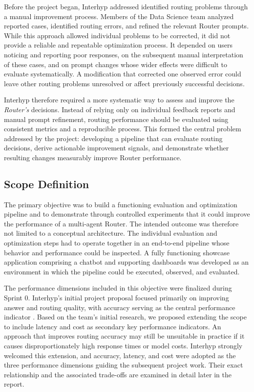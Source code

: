 Before the project began, Interhyp addressed identified routing problems through a manual improvement process. Members of the Data Science team analyzed reported cases, identified routing errors, and refined the relevant Router prompts. While this approach allowed individual problems to be corrected, it did not provide a reliable and repeatable optimization process. It depended on users noticing and reporting poor responses, on the subsequent manual interpretation of these cases, and on prompt changes whose wider effects were difficult to evaluate systematically. A modification that corrected one observed error could leave other routing problems unresolved or affect previously successful decisions.

Interhyp therefore required a more systematic way to assess and improve the \emph{Router's} decisions. Instead of relying only on individual feedback reports and manual prompt refinement, routing performance should be evaluated using consistent metrics and a reproducible process. This formed the central problem addressed by the project: developing a pipeline that can evaluate routing decisions, derive actionable improvement signals, and demonstrate whether resulting changes measurably improve Router performance.

\subsection{Scope Definition}\label{sec:scope-definition}

The primary objective was to build a functioning evaluation and optimization pipeline and to demonstrate through controlled experiments that it could improve the performance of a multi-agent Router. The intended outcome was therefore not limited to a conceptual architecture. The individual evaluation and optimization steps had to operate together in an end-to-end pipeline whose behavior and performance could be inspected. A fully functioning showcase application comprising a chatbot and supporting dashboards was developed as an environment in which the pipeline could be executed, observed, and evaluated.

The performance dimensions included in this objective were finalized during Sprint 0. Interhyp's initial project proposal focused primarily on improving answer and routing quality, with accuracy serving as the central performance indicator \autocite{interhyp-project-proposal}. Based on the team's initial research, we proposed extending the scope to include latency and cost as secondary key performance indicators. An approach that improves routing accuracy may still be unsuitable in practice if it causes disproportionately high response times or model costs. Interhyp strongly welcomed this extension, and accuracy, latency, and cost were adopted as the three performance dimensions guiding the subsequent project work. Their exact relationship and the associated trade-offs are examined in detail later in the report.

